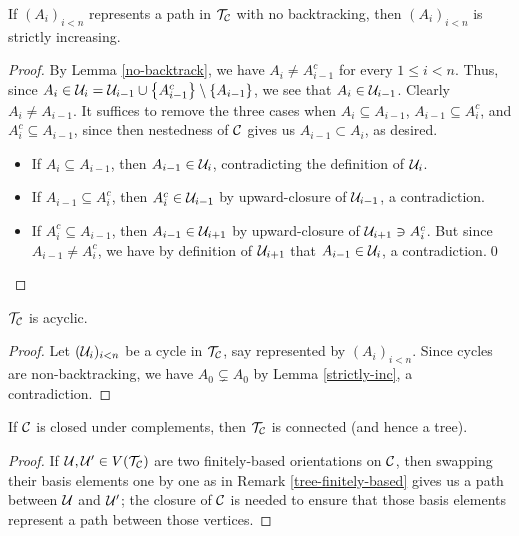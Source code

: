 \documentclass{amsart}
\begin{document}
    \begin{lemma}\label{strictly-inc}
        If $(A_i)_{i<n}$ represents a path in $\mathcal{T}_{\mathcal{C}}$ with no backtracking, then $(A_i)_{i<n}$ is strictly increasing.
    \end{lemma}
    \begin{proof}
        By Lemma \ref{no-backtrack}, we have $A_i\neq A_{i-1}^c$ for every $1\leq i<n$. Thus, since $A_i\in\mathcal{U}_i=\mathcal{U}_{i-1}\cup\left\{A_{i-1}^c\right\}\setminus\left\{A_{i-1}\right\}$, we see that $A_i\in\mathcal{U}_{i-1}$. Clearly $A_i\neq A_{i-1}$. It suffices to remove the three cases when $A_i\subseteq A_{i-1}$, $A_{i-1}\subseteq A_i^c$, and $A_i^c\subseteq A_{i-1}$, since then nestedness of $\mathcal{C}$ gives us $A_{i-1}\subset A_i$, as desired.
        \begin{itemize}
            \item If $A_i\subseteq A_{i-1}$, then $A_{i-1}\in\mathcal{U}_i$, contradicting the definition of $\mathcal{U}_i$.
            \item If $A_{i-1}\subseteq A_i^c$, then $A_i^c\in\mathcal{U}_{i-1}$ by upward-closure of $\mathcal{U}_{i-1}$, a contradiction.
            \item If $A_i^c\subseteq A_{i-1}$, then $A_{i-1}\in\mathcal{U}_{i+1}$ by upward-closure of $\mathcal{U}_{i+1}\ni A_i^c$. But since $A_{i-1}\neq A_i^c$, we have by definition of $\mathcal{U}_{i+1}$ that $A_{i-1}\in\mathcal{U}_i$, a contradiction.\qed
        \end{itemize}
    \end{proof}

    \begin{proposition}\label{acyclic}
        $\mathcal{T}_{\mathcal{C}}$ is acyclic.
    \end{proposition}
    \begin{proof}
        Let $(\mathcal{U}_i)_{i<n}$ be a cycle in $\mathcal{T}_{\mathcal{C}}$, say represented by $(A_i)_{i<n}$. Since cycles are non-backtracking, we have $A_0\subsetneq A_0$ by Lemma \ref{strictly-inc}, a contradiction.
    \end{proof}

    \begin{proposition}\label{tree}
        If $\mathcal{C}$ is closed under complements, then $\mathcal{T}_{\mathcal{C}}$ is connected (and hence a tree).
    \end{proposition}
    \begin{proof}
        If $\mathcal{U},\mathcal{U}'\in V(\mathcal{T}_{\mathcal{C}})$ are two finitely-based orientations on $\mathcal{C}$, then swapping their basis elements one by one as in Remark \ref{tree-finitely-based} gives us a path between $\mathcal{U}$ and $\mathcal{U}'$; the closure of $\mathcal{C}$ is needed to ensure that those basis elements represent a path between those vertices.
    \end{proof}
\end{document}
